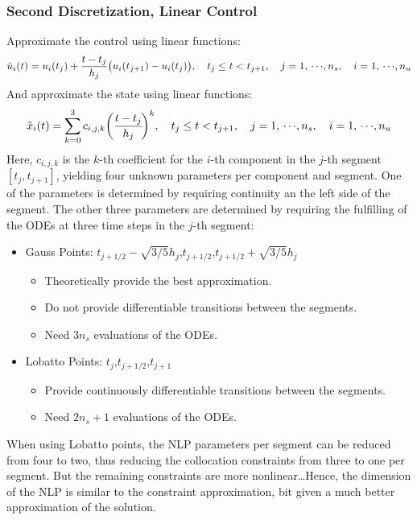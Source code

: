 			\subsubsection{Second Discretization, Linear Control}
				Approximate the control using linear functions:
				\begin{align*}
					\tilde{u}_i(t) = u_i(t_j) + \frac{t - t_j}{h_j} \big( u_i(t_{j + 1}) - u_i(t_j) \big),\quad t_j \leq t < t_{j + 1},\quad j = 1,\,\cdots\!,n_s,\quad i = 1,\,\cdots\!,n_u
				\end{align*}
				And approximate the state using linear functions:
				\begin{align*}
					\tilde{x}_i(t) = \sum_{k = 0}^{3} c_{i, j, k} \bigg( \frac{t - t_j}{h_j} \!\bigg)^k,\quad t_j \leq t < t_{j + 1},\quad j = 1,\,\cdots\!,n_s,\quad i = 1,\,\cdots\!,n_u
				\end{align*}
				Here, \( c_{i, j, k} \) is the \(k\)-th coefficient for the \(i\)-th component in the \(j\)-th segment \( [t_j, t_{j + 1}] \), yielding four unknown parameters per component and segment. One of the parameters is determined by requiring continuity an the left side of the segment. The other three parameters are determined by requiring the fulfilling of the ODEs at three time steps in the \(j\)-th segment:
				\begin{itemize}
					\item Gauss Points: \( t_{j + 1/2} - \sqrt{3/5} h_j \),\quad \( t_{j + 1/2} \),\quad \( t_{j + 1/2} + \sqrt{3/5} h_j \)
						\begin{itemize}
							\item Theoretically provide the best approximation.
							\item Do not provide differentiable transitions between the segments.
							\item Need \( 3n_s \) evaluations of the ODEs.
						\end{itemize}
					\item Lobatto Points: \( t_j \),\quad \( t_{j + 1/2} \),\quad \( t_{j + 1} \)
						\begin{itemize}
							\item Provide continuously differentiable transitions between the segments.
							\item Need \( 2n_s + 1 \) evaluations of the ODEs.
						\end{itemize}
				\end{itemize}
				When using Lobatto points, the NLP parameters per segment can be reduced from four to two, thus reducing the collocation constraints from three to one per segment. But the remaining constraints are more nonlinear\dots Hence, the dimension of the NLP is similar to the constraint approximation, bit given a much better approximation of the solution.

